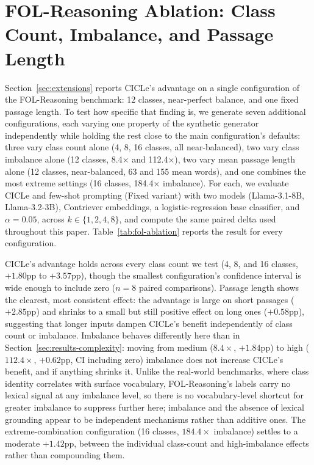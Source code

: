\documentclass[runningheads]{llncs}
\begin{document}
\section{FOL-Reasoning Ablation: Class Count, Imbalance, and Passage Length}
\label{app:fol-ablation}

Section~\ref{sec:extensions} reports CICLe's advantage on a single configuration
of the FOL-Reasoning benchmark: 12 classes, near-perfect balance, and one
fixed passage length. To test how specific that finding is, we generate
seven additional configurations, each varying one property of the
synthetic generator independently while holding the rest close to the
main configuration's defaults: three vary class count alone (4, 8, 16
classes, all near-balanced), two vary class imbalance alone (12 classes,
8.4$\times$ and 112.4$\times$), two vary mean passage length alone (12
classes, near-balanced, 63 and 155 mean words), and one combines the most
extreme settings (16 classes, 184.4$\times$ imbalance). For each, we
evaluate CICLe and few-shot prompting (Fixed variant) with two models
(Llama-3.1-8B, Llama-3.2-3B), Contriever embeddings, a logistic-regression
base classifier, and $\alpha{=}0.05$, across $k \in \{1,2,4,8\}$, and
compute the same paired delta used throughout this paper. Table~\ref{tab:fol-ablation}
reports the result for every configuration.

CICLe's advantage holds across every class count we test (4, 8, and 16
classes, $+1.80$pp to $+3.57$pp), though the smallest configuration's
confidence interval is wide enough to include zero ($n{=}8$ paired
comparisons). Passage length shows the clearest, most consistent effect:
the advantage is large on short passages ($+2.85$pp) and shrinks to a
small but still positive effect on long ones ($+0.58$pp), suggesting that
longer inputs dampen CICLe's benefit independently of class count or
imbalance. Imbalance behaves differently here than in
Section~\ref{sec:results-complexity}: moving from medium ($8.4\times$,
$+1.84$pp) to high ($112.4\times$, $+0.62$pp, CI including zero)
imbalance does not increase CICLe's benefit, and if anything shrinks it.
Unlike the real-world benchmarks, where class identity correlates with
surface vocabulary, FOL-Reasoning's labels carry no lexical signal at any
imbalance level, so there is no vocabulary-level shortcut for greater
imbalance to suppress further here; imbalance and the absence of lexical
grounding appear to be independent mechanisms rather than additive ones.
The extreme-combination configuration (16 classes, $184.4\times$
imbalance) settles to a moderate $+1.42$pp, between the individual
class-count and high-imbalance effects rather than compounding them.
\end{document}
